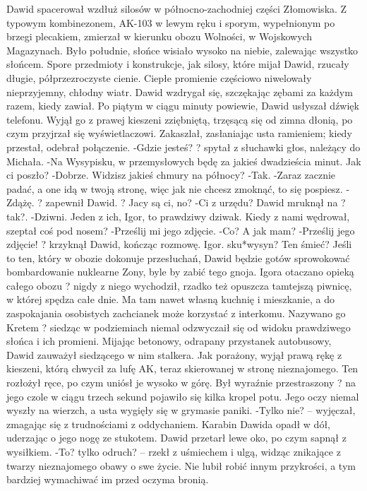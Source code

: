\documentclass[../MAIN.tex]{subfiles}
\begin{document}
Dawid spacerował wzdłuż silosów w północno-zachodniej części Złomowiska. Z typowym kombinezonem, AK-103 w lewym ręku i sporym, wypełnionym po brzegi plecakiem, zmierzał w kierunku obozu Wolności, w Wojskowych Magazynach. Było południe, słońce wisiało wysoko na niebie, zalewając wszystko słońcem. Spore przedmioty i konstrukcje, jak silosy, które mijał Dawid, rzucały długie, półprzezroczyste cienie.
Ciepłe promienie częściowo niwelowały nieprzyjemny, chłodny wiatr. Dawid wzdrygał się, szczękając zębami za każdym razem, kiedy zawiał.
Po piątym w ciągu minuty powiewie, Dawid usłyszał dźwięk telefonu. Wyjął go z prawej kieszeni zziębniętą, trzęsącą się od zimna dłonią, po czym przyjrzał się wyświetlaczowi. Zakaszlał, zasłaniając usta ramieniem; kiedy przestał, odebrał połączenie.
-Gdzie jesteś? ? spytał z słuchawki głos, należący do Michała.
-Na Wysypisku, w przemysłowych będę za jakieś dwadzieścia minut. Jak ci poszło?
-Dobrze. Widzisz jakieś chmury na północy?
-Tak.
-Zaraz zacznie padać, a one idą w twoją stronę, więc jak nie chcesz zmoknąć, to się pospiesz.
-Zdążę. ? zapewnił Dawid. ? Jacy są ci, no?
-Ci z urzędu?
Dawid mruknął na ?tak?.
-Dziwni. Jeden z ich, Igor, to prawdziwy dziwak. Kiedy z nami wędrował, szeptał coś pod nosem?
-Prześlij mi jego zdjęcie.
-Co? A jak mam?
-Prześlij jego zdjęcie! ? krzyknął Dawid, kończąc rozmowę. Igor. sku*wysyn? Ten śmieć? Jeśli to ten, który w obozie dokonuje przesłuchań, Dawid będzie gotów sprowokować bombardowanie nuklearne Zony, byle by zabić tego gnoja. Igora otaczano opieką całego obozu ? nigdy z niego wychodził, rzadko też opuszcza tamtejszą piwnicę, w której spędza całe dnie. Ma tam nawet własną kuchnię i mieszkanie, a do zaspokajania osobistych zachcianek może korzystać z interkomu. Nazywano go Kretem ? siedząc w podziemiach niemal odzwyczaił się od widoku prawdziwego słońca i ich promieni.
Mijając betonowy, odrapany przystanek autobusowy, Dawid zauważył siedzącego w nim stalkera.
Jak porażony, wyjął prawą rękę z kieszeni, którą chwycił za lufę AK, teraz skierowanej w stronę nieznajomego. Ten rozłożył ręce, po czym uniósł je wysoko w górę. Był wyraźnie przestraszony ? na jego czole w ciągu trzech sekund pojawiło się kilka kropel potu. Jego oczy niemal wyszły na wierzch, a usta wygięły się w grymasie paniki.
-Tylko nie? -- wyjęczał, zmagając się z trudnościami z oddychaniem.
Karabin Dawida opadł w dół, uderzając o jego nogę ze stukotem. Dawid przetarł lewe oko, po czym sapnął z wysiłkiem.
-To? tylko odruch? -- rzekł z uśmiechem i ulgą, widząc znikające z twarzy nieznajomego obawy o swe życie. Nie lubił robić innym przykrości, a tym bardziej wymachiwać im przed oczyma bronią.
\end{document}
